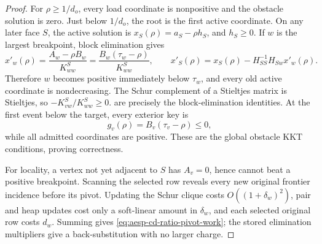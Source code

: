 \begin{proof}
For \(\rho\geq1/d_o\), every load coordinate is nonpositive and the obstacle
solution is zero.  Just below \(1/d_o\), the root is the first active
coordinate.  On any later face \(S\), the active solution is
\(x_S(\rho)=a_S-\rho h_S\), and \(h_S\geq0\).  If \(w\) is the largest
breakpoint, block elimination gives
\begin{equation*}
 x'_w(\rho)
 =\frac{A_w-\rho B_w}{K^S_{ww}}
 =\frac{B_w(\tau_w-\rho)}{K^S_{ww}},
 \qquad
 x'_S(\rho)=x_S(\rho)-H_{SS}^{-1}H_{Sw}x'_w(\rho).
\end{equation*}
Therefore \(w\) becomes positive immediately below \(\tau_w\), and every
old active coordinate is nondecreasing.  The Schur complement of a
Stieltjes matrix is Stieltjes, so
\(-K^S_{vw}/K^S_{ww}\geq0\).
 are precisely
the block-elimination identities.  At the first event below the target,
every exterior key is
\begin{equation*}
 g_v(\rho)=B_v(\tau_v-\rho)\leq0,
\end{equation*}
while all admitted coordinates are positive.  These are the global obstacle
KKT conditions, proving correctness.

For locality, a vertex not yet adjacent to \(S\) has \(A_v=0\), hence cannot
beat a positive breakpoint.  Scanning the selected row reveals every new
original frontier incidence before its pivot.  Updating the Schur clique
costs \(O((1+\delta_w)^2)\), pair and heap updates cost only a soft-linear
amount in \(\delta_w\), and each selected original row costs \(d_w\).
Summing gives
\cref{eq:aesp-cd-ratio-pivot-work}; the stored elimination multipliers give a
back-substitution with no larger charge.
\end{proof}

